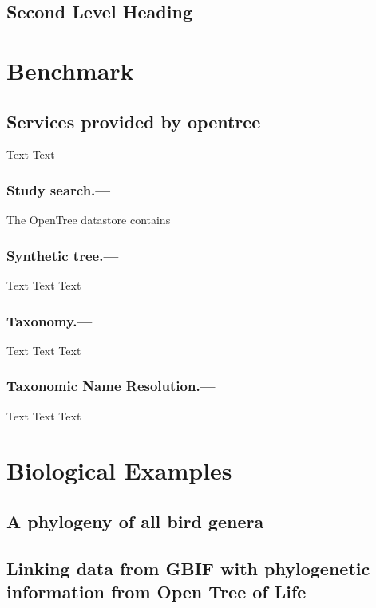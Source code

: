\documentclass[oupdraft]{sysbio_sse}
\begin{document}
\subsection{Second Level Heading}


\bigskip
\section{Benchmark}
\label{sec3}

\subsection{Services provided by opentree}

Text Text 
\subsubsection{Study search.---}The OpenTree datastore contains
\subsubsection{Synthetic tree.---}Text Text Text 
\subsubsection{Taxonomy.---}Text Text Text 
\subsubsection{Taxonomic Name Resolution.---}Text Text Text 

\bigskip

\section{Biological Examples}
\label{sec4}

\subsection{A phylogeny of all bird genera}


\subsection{Linking data from GBIF with phylogenetic information from Open Tree of Life}
\end{document}
